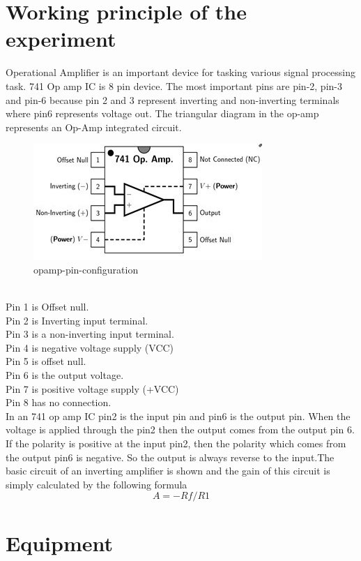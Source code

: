 \documentclass[12pt]{article}
\begin{document}
\section{Working principle of the experiment}
\large Operational Amplifier is an important device for tasking various signal processing task. 741 Op amp IC is 8 pin device. The most important pins are pin-2, pin-3 and pin-6 because pin 2 and 3 represent inverting and non-inverting terminals where pin6 represents voltage out. The triangular diagram in the op-amp represents an Op-Amp integrated circuit.\\
\begin{figure}
    \centering
    \includegraphics[scale=1]{opamp-pin-configuration.jpg}
    \caption{opamp-pin-configuration}
    \label{fig:Op amp}
\end{figure}\\
Pin 1 is Offset null.\\
Pin 2 is Inverting input terminal.\\
Pin 3 is a non-inverting input terminal.\\
Pin 4 is negative voltage supply (VCC)\\
Pin 5 is offset null.\\
Pin 6 is the output voltage.\\
Pin 7 is positive voltage supply (+VCC)\\
Pin 8 has no connection.\\
In an 741 op amp  IC pin2 is the input pin and pin6 is the output pin. When the voltage is applied through the pin2 then the output comes from the output pin 6. If the polarity is positive at the input pin2, then the polarity which comes from the output pin6 is negative. So the output is always reverse to the input.The basic circuit of an inverting amplifier is shown and the gain of this circuit is simply calculated by the following formula\\
$$A=-Rf/R1$$
\section{Equipment}
\end{document}
